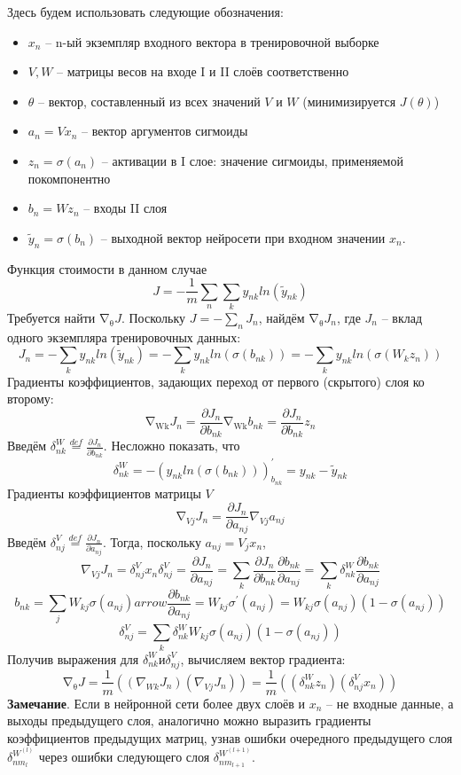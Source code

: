 \documentclass[../body.tex]{subfiles}
\begin{document}
Здесь будем использовать следующие обозначения:\\
\begin{itemize}
	\item $x_n$ -- n-ый экземпляр входного вектора в тренировочной выборке
	\item $V, W$ -- матрицы весов на входе I и II слоёв соответственно
	\item $\theta$ -- вектор, составленный из всех значений $V$ и $W$ (минимизируется $J(\theta)$)
	\item $a_n=Vx_n$ -- вектор аргументов сигмоиды
	\item $z_n=\sigma(a_n)$ -- активации в I слое: значение сигмоиды, применяемой покомпонентно
	\item $b_n=Wz_n$ -- входы II слоя
	\item ${\widetilde{y}}_n=\sigma(b_n)$ -- выходной вектор нейросети при входном значении $x_n$.
\end{itemize}

Функция стоимости в данном случае
$$J=-\frac{1}{m}\sum_{n}\sum_{k} y_{nk}ln({\widetilde{y}}_{nk})$$
Требуется найти $\mathrm{\nabla}_\mathrm{\theta}J$. Поскольку $J=-\sum_{n} J_n$, найдём $\mathrm{\nabla}_\mathrm{\theta}J_n$, где $J_n$ – вклад одного экземпляра тренировочных данных:
$$J_n=-\sum_{k} y_{nk}ln({\widetilde{y}}_{nk})=-\sum_{k} y_{nk}ln(\sigma(b_{nk}))=-\sum_{k} y_{nk}ln(\sigma(W_kz_n))$$
Градиенты коэффициентов, задающих переход от первого (скрытого) слоя ко второму:
$$\mathrm{\nabla}_{\mathrm{Wk}}J_n=\frac{\partial J_n}{\partial b_{nk}}\mathrm{\nabla}_{\mathrm{Wk}}b_{nk}=\frac{\partial J_n}{\partial b_{nk}}z_n$$
Введём $\delta_{nk}^W\overset{def}{=}\frac{\partial J_n}{\partial b_{nk}}$. Несложно показать, что $$\delta_{nk}^W=-(y_{nk}ln(\sigma(b_{nk})))_{b_{nk}}^\prime=y_{nk}-{\widetilde{y}}_{nk}$$
Градиенты коэффициентов матрицы $V$
$$\mathrm{\nabla}_{Vj}J_n=\frac{\partial J_n}{\partial a_{nj}}\nabla_{Vj}a_{nj}$$
Введём $\delta_{nj}^V\overset{def}{=}\frac{\partial J_n}{\partial a_{nj}}$. Тогда, поскольку $a_{nj}=V_jx_n$,
$$\nabla_{Vj}J_n=\delta_{nj}^Vx_n
\delta_{nj}^V=\frac{\partial J_n}{\partial a_{nj}}=\sum_{k}{\frac{\partial J_n}{\partial b_{nk}}\frac{\partial b_{nk}}{\partial a_{nj}}}=\sum_{k}{\delta_{nk}^W\frac{\partial b_{nk}}{\partial a_{nj}}}$$
$$b_{nk}=\sum_{j} W_{kj}\sigma(a_{nj})arrow\frac{\partial b_{nk}}{\partial a_{nj}}=W_{kj}\sigma^\prime(a_{nj})=W_{kj}\sigma(a_{nj})(1-\sigma(a_{nj}))$$
$$\delta_{nj}^V=\sum_{k}\delta_{nk}^WW_{kj}\sigma(a_{nj})(1-\sigma(a_{nj}))$$
Получив выражения для $\delta_{nk}^W и \delta_{nj}^V$, вычисляем вектор градиента:
$$\mathrm{\nabla}_\mathrm{\theta}J=\frac{1}{m}((\nabla_{Wk}J_n) (\nabla_{Vj}J_n))=\frac{1}{m}((\delta_{nk}^Wz_n) (\delta_{nj}^Vx_n) )$$
\textbf{Замечание}. Если в нейронной сети более двух слоёв и $x_n$ – не входные данные, а выходы предыдущего слоя, аналогично можно выразить градиенты коэффициентов предыдущих матриц, узнав ошибки очередного предыдущего слоя $\delta_{nm_l}^{W^{(l)}}$ через ошибки следующего слоя $\delta_{nm_{l+1}}^{W^{(l+1)}}$.
\end{document}
